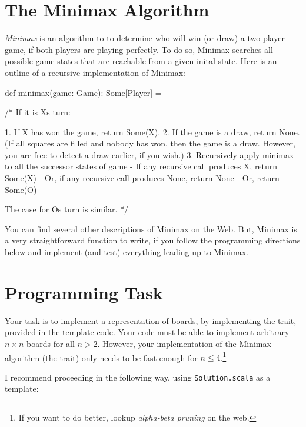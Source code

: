 \documentclass{book}
\begin{document}
\section{The Minimax Algorithm}

\emph{Minimax} is an algorithm to to determine who will win (or draw)
a two-player game, if both players are playing perfectly. To do so, Minimax
searches all possible game-states that are reachable from a given inital
state. Here is an outline of a recursive implementation of Minimax:

\begin{scalacode}
def minimax(game: Game): Some[Player] = {

  /*
  If it is Xs turn:

    1. If X has won the game, return Some(X).
    2. If the game is a draw, return None. (If all squares are filled
       and nobody has won, then the game is a draw. However, you are
       free to detect a draw earlier, if you wish.)
    3. Recursively apply minimax to all the successor states of game
       - If any recursive call produces X, return Some(X)
       - Or, if any recursive call produces None, return None
       - Or, return Some(O)

  The case for Os turn is similar.
  */

}
\end{scalacode}

You can find several other descriptions of Minimax on the Web. But, Minimax
 is a very straightforward function to write, if you follow the programming directions below
and implement (and test) everything leading up to Minimax.

\section{Programming Task}

Your task is to implement a representation of boards, by implementing
the  trait, provided in the template code.
Your code must be able to implement arbitrary $n \times n$ boards for
all $n > 2$. However, your implementation of the Minimax algorithm
(the  trait) only needs to be fast enough for
 $n \le 4$.\footnote{If you want to do better, lookup \emph{alpha-beta pruning} on the web.}

I recommend proceeding in the following way, using
\texttt{Solution.scala} as a template:
\end{document}
